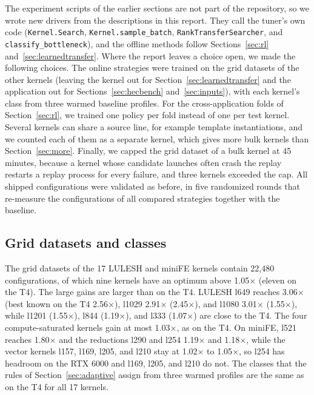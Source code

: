 \documentclass[10pt]{article}
\newcommand{\x}{\ensuremath{\times}}
\newcommand{\code}[1]{\texttt{#1}}
\begin{document}
The experiment scripts of the earlier sections are not part of the
repository, so we wrote new drivers from the descriptions in this report.
They call the tuner's own code (\code{Kernel.Search},
\code{Kernel.sample\_batch}, \code{RankTransferSearcher}, and
\code{classify\_bottleneck}), and the offline methods follow
Sections~\ref{sec:rl} and~\ref{sec:learnedtransfer}. Where the report leaves a
choice open, we made the following choices. The online strategies were
trained on the grid datasets of the other kernels (leaving the kernel
out for Section~\ref{sec:learnedtransfer} and the application out for
Sections~\ref{sec:hecbench} and~\ref{sec:inputs}), with each kernel's class
from three warmed baseline profiles. For the cross-application folds of
Section~\ref{sec:rl}, we trained one policy per fold instead of one per test
kernel. Several kernels can share a source line, for example template
instantiations, and we counted each of them as a separate kernel, which gives
more bulk kernels than Section~\ref{sec:more}. Finally, we capped the
grid dataset of a bulk kernel at 45 minutes, because a kernel whose candidate
launches often crash the replay restarts a replay process for every failure,
and three kernels exceeded the cap. All shipped configurations were validated
as before, in five randomized rounds that re-measure the configurations of
all compared strategies together with the baseline.

\subsection{Grid datasets and classes}
The grid datasets of the 17 LULESH and miniFE kernels contain 22{,}480
configurations, of which nine kernels have an optimum above 1.05\x{} (eleven on
the T4). The large gains are larger than on the T4. LULESH l649 reaches
3.06\x{} (best known on the T4 2.56\x{}), l1029 2.91\x{} (2.45\x{}), and l1080
3.01\x{} (1.55\x{}), while l1201 (1.55\x{}), l844 (1.19\x{}), and l333
(1.07\x{}) are close to the T4. The four compute-saturated kernels gain at most
1.03\x{}, as on the T4. On miniFE, l521 reaches 1.80\x{} and the reductions l290
and l254 1.19\x{} and 1.18\x{}, while the vector kernels l157, l169, l205, and
l210 stay at 1.02\x{} to 1.05\x{}, so l254 has headroom on the RTX 6000 and l169,
l205, and l210 do not. The classes that the rules of
Section~\ref{sec:adaptive} assign from three warmed profiles are the same as
on the T4 for all 17 kernels.
\end{document}
